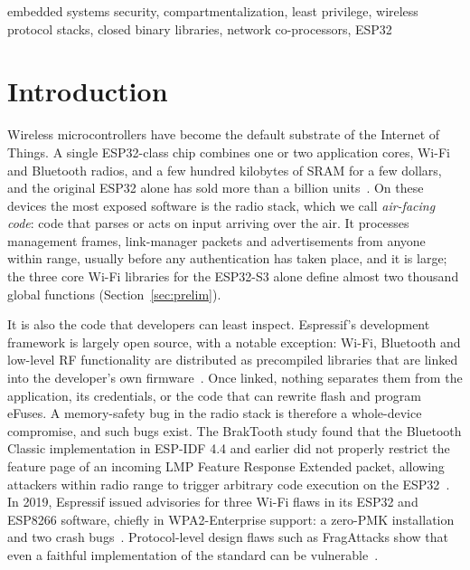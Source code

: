 \documentclass[conference,10pt]{IEEEtran}
\begin{document}
\begin{IEEEkeywords}
embedded systems security, compartmentalization, least privilege, wireless protocol stacks, closed binary libraries, network co-processors, ESP32
\end{IEEEkeywords}

\section{Introduction}
\label{sec:intro}

Wireless microcontrollers have become the default substrate of the Internet of Things. A single ESP32-class chip combines one or two application cores, Wi-Fi and Bluetooth radios, and a few hundred kilobytes of SRAM for a few dollars, and the original ESP32 alone has sold more than a billion units~\cite{devreker2024liberating}. On these devices the most exposed software is the radio stack, which we call \emph{air-facing code}: code that parses or acts on input arriving over the air. It processes management frames, link-manager packets and advertisements from anyone within range, usually before any authentication has taken place, and it is large; the three core Wi-Fi libraries for the ESP32-S3 alone define almost two thousand global functions (Section~\ref{sec:prelim}).

It is also the code that developers can least inspect. Espressif's development framework is largely open source, with a notable exception: Wi-Fi, Bluetooth and low-level RF functionality are distributed as precompiled libraries that are linked into the developer's own firmware~\cite{devreker2023unveiling}. Once linked, nothing separates them from the application, its credentials, or the code that can rewrite flash and program eFuses. A memory-safety bug in the radio stack is therefore a whole-device compromise, and such bugs exist. The BrakTooth study found that the Bluetooth Classic implementation in ESP-IDF 4.4 and earlier did not properly restrict the feature page of an incoming LMP Feature Response Extended packet, allowing attackers within radio range to trigger arbitrary code execution on the ESP32~\cite{garbelini2022braktooth,nvd202128139}. In 2019, Espressif issued advisories for three Wi-Fi flaws in its ESP32 and ESP8266 software, chiefly in WPA2-Enterprise support: a zero-PMK installation and two crash bugs~\cite{espressif2019zeropmk}. Protocol-level design flaws such as FragAttacks show that even a faithful implementation of the standard can be vulnerable~\cite{vanhoef2021fragattacks}.
\end{document}
